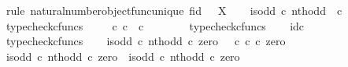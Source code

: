 \begin{isabellebody}
%
\isadelimproof
%
\endisadelimproof
%
\isatagproof
{}\isamarkupfalse%
\ {\isacharparenleft}{\kern0pt}rule\ natural{\isacharunderscore}{\kern0pt}number{\isacharunderscore}{\kern0pt}object{\isacharunderscore}{\kern0pt}func{\isacharunderscore}{\kern0pt}unique{\isacharbrackleft}{\kern0pt}\ f{\isacharequal}{\kern0pt}{\isachardoublequoteopen}id\ {\isasymOmega}{\isachardoublequoteclose}{\isacharcomma}{\kern0pt}\ \ X{\isacharequal}{\kern0pt}{\isasymOmega}{\isacharbrackright}{\kern0pt}{\isacharparenright}{\kern0pt}\isanewline
\ \ \isamarkupfalse%
\ {\isachardoublequoteopen}is{\isacharunderscore}{\kern0pt}odd\ {\isasymcirc}\isactrlsub c\ nth{\isacharunderscore}{\kern0pt}odd\ {\isacharcolon}{\kern0pt}\ {\isasymnat}\isactrlsub c\ {\isasymrightarrow}\ {\isasymOmega}{\isachardoublequoteclose}\isanewline
\ \ \ \ \isamarkupfalse%
\ typecheck{\isacharunderscore}{\kern0pt}cfuncs\isanewline
\ \ \isamarkupfalse%
\ {\isachardoublequoteopen}{\isasymt}\ {\isasymcirc}\isactrlsub c\ {\isasymbeta}\isactrlbsub {\isasymnat}\isactrlsub c\isactrlesub \ {\isacharcolon}{\kern0pt}\ {\isasymnat}\isactrlsub c\ {\isasymrightarrow}\ {\isasymOmega}{\isachardoublequoteclose}\isanewline
\ \ \ \ \isamarkupfalse%
\ typecheck{\isacharunderscore}{\kern0pt}cfuncs\isanewline
\ \ \isamarkupfalse%
\ {\isachardoublequoteopen}id\isactrlsub c\ {\isasymOmega}\ {\isacharcolon}{\kern0pt}\ {\isasymOmega}\ {\isasymrightarrow}\ {\isasymOmega}{\isachardoublequoteclose}\isanewline
\ \ \ \ \isamarkupfalse%
\ typecheck{\isacharunderscore}{\kern0pt}cfuncs\isanewline
\isanewline
\ \ \isamarkupfalse%
\ {\isachardoublequoteopen}{\isacharparenleft}{\kern0pt}is{\isacharunderscore}{\kern0pt}odd\ {\isasymcirc}\isactrlsub c\ nth{\isacharunderscore}{\kern0pt}odd{\isacharparenright}{\kern0pt}\ {\isasymcirc}\isactrlsub c\ zero\ {\isacharequal}{\kern0pt}\ {\isacharparenleft}{\kern0pt}{\isasymt}\ {\isasymcirc}\isactrlsub c\ {\isasymbeta}\isactrlbsub {\isasymnat}\isactrlsub c\isactrlesub {\isacharparenright}{\kern0pt}\ {\isasymcirc}\isactrlsub c\ zero{\isachardoublequoteclose}\isanewline
\ \ \isamarkupfalse%
\ {\isacharminus}{\kern0pt}\isanewline
\ \ \ \ \isamarkupfalse%
\ {\isachardoublequoteopen}{\isacharparenleft}{\kern0pt}is{\isacharunderscore}{\kern0pt}odd\ {\isasymcirc}\isactrlsub c\ nth{\isacharunderscore}{\kern0pt}odd{\isacharparenright}{\kern0pt}\ {\isasymcirc}\isactrlsub c\ zero\ {\isacharequal}{\kern0pt}\ is{\isacharunderscore}{\kern0pt}odd\ {\isasymcirc}\isactrlsub c\ nth{\isacharunderscore}{\kern0pt}odd\ {\isasymcirc}\isactrlsub c\ zero{\isachardoublequoteclose}\isanewline

\end{isabellebody}
